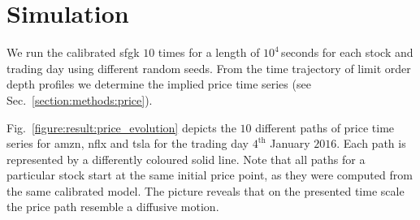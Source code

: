 \documentclass[11pt, a4paper]{thesis}  %
\begin{document}
\section{Simulation}
\label{section:result:simulation}

We run the calibrated \ac{sfgk} $10$ times for a length of $10^4\,$seconds for each stock and trading day using different random seeds. From the time trajectory of limit order depth profiles we determine the implied price time series (see Sec.~\ref{section:methods:price}).

Fig.~\ref{figure:result:price_evolution} depicts the $10$ different paths of price time series for \ac{amzn}, \ac{nflx} and \ac{tsla} for the trading day $4^\textrm{th}$ January $2016$. Each path is represented by a differently coloured solid line. Note that all paths for a particular stock start at the same initial price point, as they were computed from the same calibrated model. The picture reveals that on the presented time scale the price path resemble a diffusive motion. 

\end{document}
